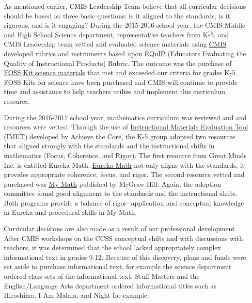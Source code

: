 \documentclass{report}
\begin{document}
\begin{findings}

As mentioned earlier, CMIS Leadership Team believe that all curricular decisions should be based on three basic questions: is it aligned to the standards, is it rigorous, and is it engaging? During the 2015-2016 school year, the CMIS Middle and High School Science department, representative teachers from K-5, and CMIS Leadership team vetted and evaluated science materials using \href{https://docs.google.com/a/cmis.ac.th/document/d/1u0crwv2uVJdfamGYP9NYsUvub7bkPO64dIu0uAAkSIo/edit?usp=sharing}{CMIS developed rubrics} and instruments based upon \href{https://drive.google.com/a/cmis.ac.th/file/d/0ByVFfrm0zfolWmtFbld4MExkdGc/view?usp=sharing}{EQuIP} (Educators Evaluating the Quality of Instructional Products) Rubric. The outcome was the purchase of \href{https://drive.google.com/drive/folders/0ByVFfrm0zfolVERNZUJiX2pYNjA?usp=sharing}{FOSS Kit science materials} that met and exceeded our criteria for grades K-5. FOSS Kits for science have been purchased and CMIS will continue to provide time and assistance to help teachers utilize and implement this curriculum resource. 

During the 2016-2017 school year, mathematics curriculum was reviewed and and resources were vetted. Through the use of \href{https://drive.google.com/drive/folders/0ByVFfrm0zfolWHVZRlNuYWppWGM?usp=sharing}{Instructional Materials Evaluation Tool} (IMET) developed by Achieve the Core, the K-5 group adopted two resources that aligned strongly with the standards and the instructional shifts in mathematics (Focus, Coherence, and Rigor). The first resource from Great Minds Inc. is entitled Eureka Math. \href{https://greatminds.org/math}{Eureka Math} not only aligns with the standards, it provides appropriate coherence, focus, and rigor. The second resource vetted and purchased was \href{http://help.k12.mhedu.com/connected/}{My Math} published by McGraw Hill. Again, the adoption committee  found good alignment to the standards and the instructional shifts. Both programs provide a balance of rigor- application and conceptual knowledge in Eureka and procedural skills in My Math. 

Curricular decisions are also made as a result of our professional development.  After CMIS workshops on the CCSS conceptual shifts and with discussions with teachers, it was determined that the school lacked appropriately complex informational text in grades 9-12. Because of this discovery, plans and funds were set aside to purchase informational text, for example the science department ordered class sets of the informational text, Stuff Matters and the English/Language Arts department ordered informational titles such as Hiroshima, I Am Malala, and Night for example. 


\end{findings}
\end{document}
